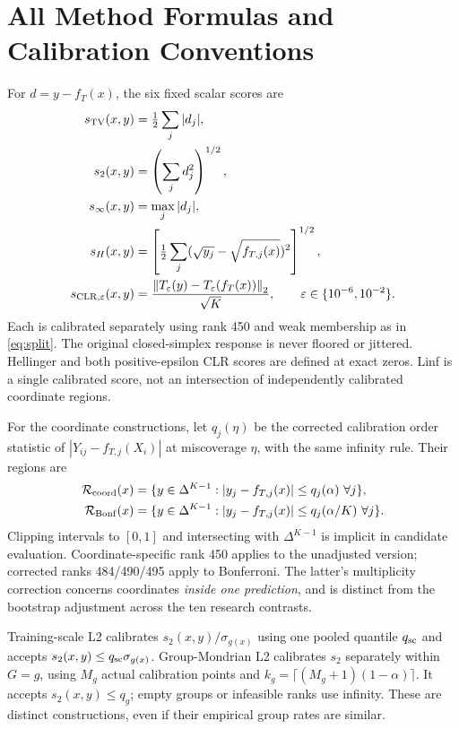 \documentclass{article}
\theoremstyle{plain}
\newcommand{\simp}{\Delta^{K-1}}
\newcommand{\R}{\mathcal{R}}
\newcommand{\norm}[1]{\left\lVert #1\right\rVert}
\begin{document}
\section{All Method Formulas and Calibration Conventions}
\label{app:methods}
For $d=y-f_T(x)$, the six fixed scalar scores are
\begin{align}
 s_{\rm TV}(x,y)&=\tfrac12\sum_j|d_j|,\\
 s_2(x,y)&=\left(\sum_jd_j^2\right)^{1/2},\\
 s_\infty(x,y)&=\max_j|d_j|,\\
 s_H(x,y)&=\left[\tfrac12\sum_j(\sqrt{y_j}-\sqrt{f_{T,j}(x)})^2\right]^{1/2},\\
 s_{{\rm CLR},\varepsilon}(x,y)&=\frac{\norm{T_\varepsilon(y)-T_\varepsilon(f_T(x))}_2}{\sqrt K},
 \qquad\varepsilon\in\{10^{-6},10^{-2}\}.
\end{align}
Each is calibrated separately using rank 450 and weak membership as in \eqref{eq:split}. The original closed-simplex response is never floored or jittered. Hellinger and both positive-epsilon CLR scores are defined at exact zeros. Linf is a single calibrated score, not an intersection of independently calibrated coordinate regions.

For the coordinate constructions, let $q_j(\eta)$ be the corrected calibration order statistic of $|Y_{ij}-f_{T,j}(X_i)|$ at miscoverage $\eta$, with the same infinity rule. Their regions are
\begin{align}
 \R_{\rm coord}(x)&=\{y\in\simp:|y_j-f_{T,j}(x)|\leq q_j(\alpha)\ \forall j\},\\
 \R_{\rm Bonf}(x)&=\{y\in\simp:|y_j-f_{T,j}(x)|\leq q_j(\alpha/K)\ \forall j\}.
\end{align}
Clipping intervals to $[0,1]$ and intersecting with $\simp$ is implicit in candidate evaluation. Coordinate-specific rank 450 applies to the unadjusted version; corrected ranks 484/490/495 apply to Bonferroni. The latter's multiplicity correction concerns coordinates \emph{inside one prediction}, and is distinct from the bootstrap adjustment across the ten research contrasts.

Training-scale L2 calibrates $s_2(x,y)/\sigma_{g(x)}$ using one pooled quantile $q_{\rm sc}$ and accepts $s_2(x,y)\leq q_{\rm sc}\sigma_{g(x)}$. Group-Mondrian L2 calibrates $s_2$ separately within $G=g$, using $M_g$ actual calibration points and $k_g=\lceil(M_g+1)(1-\alpha)\rceil$. It accepts $s_2(x,y)\leq q_g$; empty groups or infeasible ranks use infinity. These are distinct constructions, even if their empirical group rates are similar.
\end{document}
